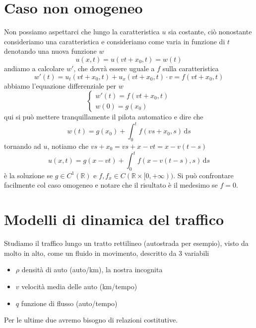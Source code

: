 \documentclass[10pt,a4paper,twoside,openright]{book}
\newcommand{\de}{\,\mathrm d}
\newcommand{\ds}{\de s}
\begin{document}
\section{Caso non omogeneo}
\label{sec:leggi-conservazione-non-omogeneo}

Non possiamo aspettarci che lungo la caratteristica $u$ sia costante, ciò nonostante consideriamo una caratteristica e consideriamo come varia in funzione di $t$ denotando una nuova funzione $w$
\begin{equation*}
    u(x,t) = u(vt+x_{0} ,t) =w(t)
\end{equation*}
andiamo a calcolare $w'$, che dovrà essere uguale a $f$ sulla caratteristica
\begin{equation*}
    w'(t) =u_{t}(vt+x_{0} ,t) +u_{x}(vt+x_{0} ,t) \cdotp v=f(vt+x_{0} ,t)
\end{equation*}
abbiamo l'equazione differenziale per $w$
\begin{equation*}
    \begin{cases}
        w'(t) =f(vt+x_{0} ,t) \\
        w(0) =g(x_{0})
    \end{cases}
\end{equation*}
qui si può mettere tranquillamente il pilota automatico e dire che
\begin{equation*}
    w(t) =g(x_{0}) +\int ^{t}_{0} f(vs+x_{0} ,s) \ds
\end{equation*}
tornando ad $u$, notiamo che $vs+x_{0}=vs+x-vt=x-v(t-s)$
\begin{equation}
    u(x,t) =g(x-vt) +\int ^{t}_{0} f(x-v(t-s) ,s) \ds
\end{equation}
è la soluzione se $g\in C^{1}(\mathbb{R})$ e $f,f_{x} \in C(\mathbb{R} \times [ 0,+\infty))$. Si può confrontare facilmente col caso omogeneo e notare che il risultato è il medesimo se $f=0$.

\section{Modelli di dinamica del traffico}

Studiamo il traffico lungo un tratto rettilineo (autostrada per esempio), visto da molto in alto, come un fluido in movimento, descritto da $3$ variabili
\begin{itemize}
    \item $\rho $ densità di auto (auto/km), la nostra incognita
    \item $v$ velocità media delle auto (km/tempo)
    \item $q$ funzione di flusso (auto/tempo)
\end{itemize}
Per le ultime due avremo bisogno di relazioni costitutive.
\end{document}
